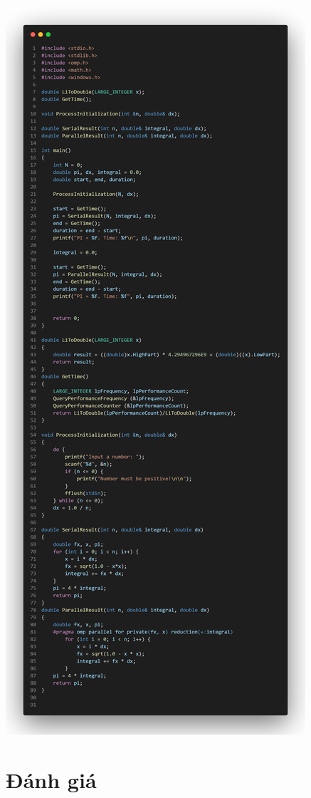 \documentclass[12pt,a4paper]{report}
\begin{document}
\begin{center}
\clearpage
	\includegraphics[trim=0in 0in 0in 32.2in, clip, scale=0.2]{./Photos/PI/parallel.PNG}
\end{center}
\section{Đánh giá}
\end{document}

